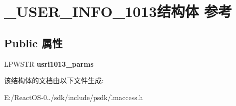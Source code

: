 \hypertarget{struct___u_s_e_r___i_n_f_o__1013}{}\section{\+\_\+\+U\+S\+E\+R\+\_\+\+I\+N\+F\+O\+\_\+1013结构体 参考}
\label{struct___u_s_e_r___i_n_f_o__1013}
\subsection*{Public 属性}
\begin{DoxyCompactItemize}
\item 
\mbox{\label{struct___u_s_e_r___i_n_f_o__1013_a5be9a7dce6316f46394df52efa16e8f4}} 
L\+P\+W\+S\+TR {\bfseries usri1013\+\_\+parms}
\end{DoxyCompactItemize}


该结构体的文档由以下文件生成\+:\begin{DoxyCompactItemize}
\item 
E\+:/\+React\+O\+S-\/0../sdk/include/psdk/lmaccess.\+h\end{DoxyCompactItemize}
